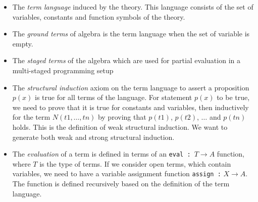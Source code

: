 \begin{itemize}
		\item The \emph{term language} induced by the theory. This language consists of the set of 
		variables, constants and function symbols of the theory. 
		\begin{comment}
		Terms of algebra: The set of terms $T_{OP,s}(X)$ of sort $s \in S$ for the algebra $(S, OP)$ 
		using the set $X$ of variables is defined as
		\begin{itemize}
			\item $X_s \cup K_s \subseteq T_{OP,s}(X)$ where $K_s$ is the set of constant symbols of sort $s$ and $X_s$ is the set of variables of sort $s$. 
			\item $N(t1, \ldots, tn) \in T_{OP,s}(X)$ for all operation symbols $N \in OP$ with $N : s_1 \ldots s_n \rightarrow s$ and all terms $t1 \in T_{OP,s1}(X), \ldots, tn \in T_{OP,sn}(X)$.
			\item There are no further terms of sort $s$ in $T_{OP,s}(X)$. 
		\end{itemize}
		\end{comment}
		\item The \emph{ground terms} of algebra is the term language when the set of variable is 
		empty. 
		\item The \emph{staged terms} of the algebra which are used for partial evaluation in a 
		multi-staged programming setup 
		\item The \emph{structural induction} axiom on the term language to assert a proposition 
		$p(x)$ is true for all terms of the language. For statement $p(x)$ to be true, we need to prove 
		that it is true for constants and variables, then inductively for the term $N(t1, \ldots, tn)$ by 
		proving that $p(t1)$, $p(t2)$, $\ldots$ and $p(tn)$ holds. This is the definition of weak structural 
		induction. We want to generate both weak and strong structural induction. 
		\item The \emph{evaluation} of a term is defined in terms of an \verb|eval : |$T \rightarrow A$ 
		function, where $T$ is the type of terms. If we consider open terms, which contain variables, 
		we need to have a variable assignment function \verb|assign :| $X \rightarrow A$. The 
		function is defined recursively based on the definition of the term language. 
		\begin{comment}
		Let $T_{OP}$ be the set of ground terms of a signature $SIG = (S, OP)$ and $A$ a $SIG-$Algebra. The evaluation function $eval : T_{OP} \rightarrow A$ is recursively defined by 
		\begin{itemize}

\end{comment}
\end{itemize}
